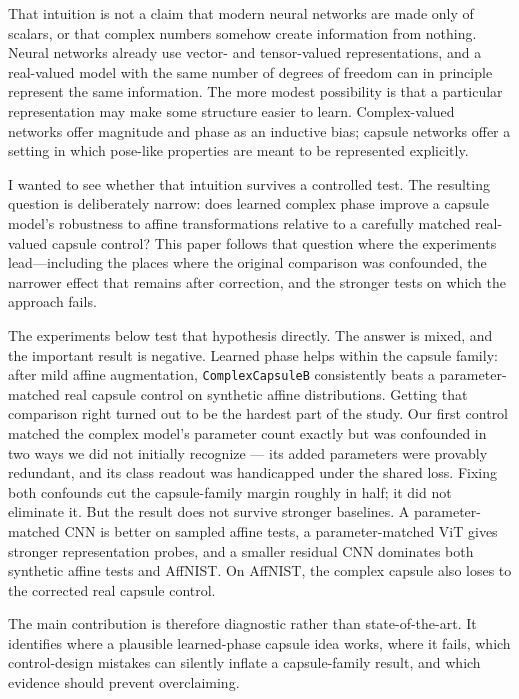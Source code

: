 \documentclass[11pt]{article}
\begin{document}
That intuition is not a claim that modern neural networks are made only of scalars, or that complex numbers somehow create information from nothing. Neural networks already use vector- and tensor-valued representations, and a real-valued model with the same number of degrees of freedom can in principle represent the same information. The more modest possibility is that a particular representation may make some structure easier to learn. Complex-valued networks offer magnitude and phase as an inductive bias; capsule networks offer a setting in which pose-like properties are meant to be represented explicitly.

I wanted to see whether that intuition survives a controlled test. The resulting question is deliberately narrow: does learned complex phase improve a capsule model's robustness to affine transformations relative to a carefully matched real-valued capsule control? This paper follows that question where the experiments lead---including the places where the original comparison was confounded, the narrower effect that remains after correction, and the stronger tests on which the approach fails.

The experiments below test that hypothesis directly. The answer is mixed, and the important result is negative. Learned phase helps within the capsule family: after mild affine augmentation, \texttt{ComplexCapsuleB} consistently beats a parameter-matched real capsule control on synthetic affine distributions. Getting that comparison right turned out to be the hardest part of the study. Our first control matched the complex model's parameter count exactly but was confounded in two ways we did not initially recognize --- its added parameters were provably redundant, and its class readout was handicapped under the shared loss. Fixing both confounds cut the capsule-family margin roughly in half; it did not eliminate it. But the result does not survive stronger baselines. A parameter-matched CNN is better on sampled affine tests, a parameter-matched ViT gives stronger representation probes, and a smaller residual CNN dominates both synthetic affine tests and AffNIST. On AffNIST, the complex capsule also loses to the corrected real capsule control.

The main contribution is therefore diagnostic rather than state-of-the-art. It identifies where a plausible learned-phase capsule idea works, where it fails, which control-design mistakes can silently inflate a capsule-family result, and which evidence should prevent overclaiming.
\end{document}
